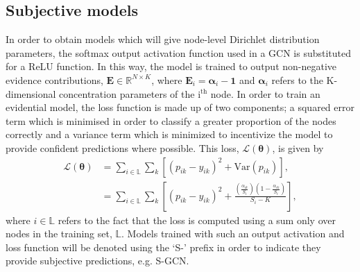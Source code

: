\documentclass[journal]{IEEEtran}
\begin{document}
\subsection{Subjective models}
In order to obtain models which will give node-level Dirichlet distribution parameters, the softmax output activation function used in a GCN is substituted for a ReLU function. In this way, the model is trained to output non-negative evidence contributions, $\mathbf{E}\in\mathbb{R}^{N\times K}$, where $\mathbf{E}_{i} = \boldsymbol{\alpha}_{i}-\mathbf{1}$ and $\boldsymbol{\alpha}_{i}$ refers to the K-dimensional concentration parameters of the $\text{i}^\text{th}$ node. In order to train an evidential model, the loss function is made up of two components; a squared error term which is minimised in order to classify a greater proportion of the nodes correctly and a variance term which is minimized to incentivize the model to provide confident predictions where possible. This loss, $\mathcal{L}(\boldsymbol{\theta})$, is given by
\begin{equation}
\begin{split}
    \mathcal{L}(\boldsymbol{\theta})&=\sum_{i\in\mathbb{L}}\sum_k \left[(p_{ik}-y_{ik})^2+\text{Var}(p_{ik})\right],\\
    &=\sum_{i\in\mathbb{L}}\sum_k \left[(p_{ik}-y_{ik})^2+\frac{\left(\frac{\alpha_{ik}}{S_i}\right)\left(1-\frac{\alpha_{ik}}{S_i}\right)}{S_i-K}\right],
\end{split}
\label{eq:core_loss}
\end{equation}
where $i\in\mathbb{L}$ refers to the fact that the loss is computed using a sum only over nodes in the training set, $\mathbb{L}$. Models trained with such an output activation and loss function will be denoted using the `S-' prefix in order to indicate they provide subjective predictions, e.g. S-GCN.
\end{document}
